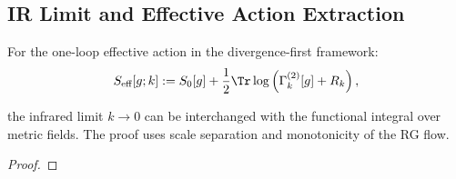 \subsection{IR Limit and Effective Action Extraction}
\label{subsec:irLimitEffectiveAction}

\begin{lemma}
\label{lem:irLimitCommutes}

For the one-loop effective action in the divergence-first framework:
\begin{equation}
S_{\text{eff}}[g; k] := S_0[g] + \frac{1}{2} \Tr \log\left(\Gamma_k^{(2)}[g] + R_k\right),
\end{equation}

the infrared limit $k \to 0$ can be interchanged with the functional integral over metric fields. The proof uses scale separation and monotonicity of the RG flow.

\begin{proof}

\end{proof}
\end{lemma}

